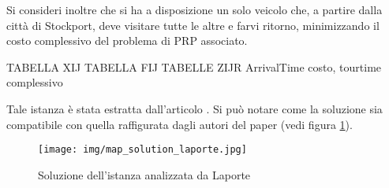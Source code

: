 		Si consideri inoltre che si ha a disposizione un solo veicolo che, a partire dalla città di  Stockport, deve visitare tutte le altre e farvi ritorno, minimizzando il costo complessivo del problema di PRP associato.

		TABELLA XIJ
		TABELLA FIJ
		TABELLE ZIJR
		ArrivalTime
		costo, tourtime complessivo

		Tale istanza è stata estratta dall’articolo \cite{Laporte11}. Si può notare come la soluzione sia compatibile con quella raffigurata dagli autori del paper (vedi figura \ref{fig:map_laporte}). 

		\begin{figure}[H]
			\centering
			\texttt{[image: img/map\_solution\_laporte.jpg]}
			\caption{Soluzione dell'istanza analizzata da Laporte \cite{Laporte11}}
			\label{fig:map_laporte}
		\end{figure}		
		
		
